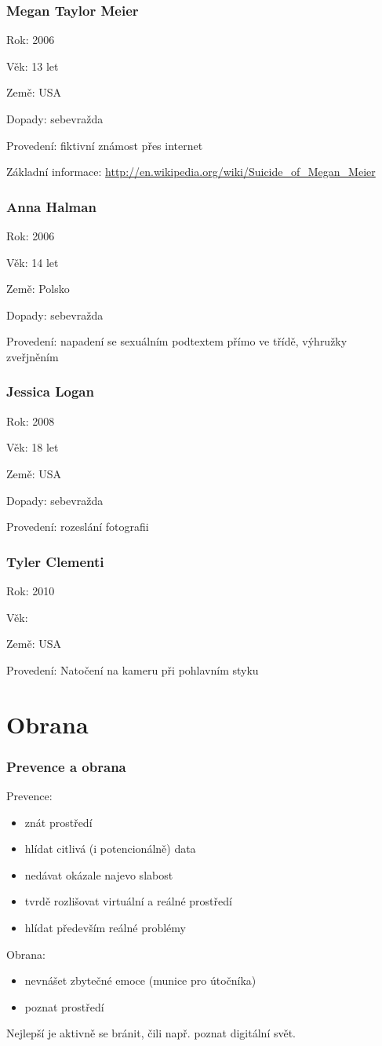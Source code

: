 \documentclass[xetex]{beamer}
\begin{document}
\begin{frame}
	\frametitle{Megan Taylor Meier}

	Rok: 2006

	Věk: 13 let

	Země: USA

	Dopady: sebevražda
	
	Provedení: fiktivní známost přes internet

	Základní informace: \url{http://en.wikipedia.org/wiki/Suicide\_of\_Megan\_Meier}
\end{frame}

\begin{frame}
  \frametitle{Anna Halman}

  Rok: 2006

	Věk: 14 let

	Země: Polsko

	Dopady: sebevražda

	Provedení: napadení se sexuálním podtextem přímo ve třídě, výhružky zveřjněním
\end{frame}


\begin{frame}
	\frametitle{Jessica Logan}

	Rok: 2008

	Věk: 18 let

	Země: USA

	Dopady: sebevražda

	Provedení: rozeslání fotografii
\end{frame}

\begin{frame}
	\frametitle{Tyler Clementi}
	Rok: 2010

	Věk:

	Země: USA

	Provedení: Natočení na kameru při pohlavním styku
\end{frame}

\section{Obrana}
\begin{frame}
	\frametitle{Prevence a obrana}

Prevence:
	\begin{itemize}
		\item znát prostředí
		\item hlídat citlivá (i potencionálně) data
		\item nedávat okázale najevo slabost
		\item tvrdě rozlišovat virtuální a reálné prostředí
		\item hlídat především reálné problémy
	\end{itemize}	

Obrana:
	\begin{itemize}
		\item nevnášet zbytečné emoce (munice pro útočníka)
		\item poznat prostředí
	\end{itemize}

	Nejlepší je aktivně se bránit, čili např. poznat digitální svět.
\end{frame}
\end{document}
